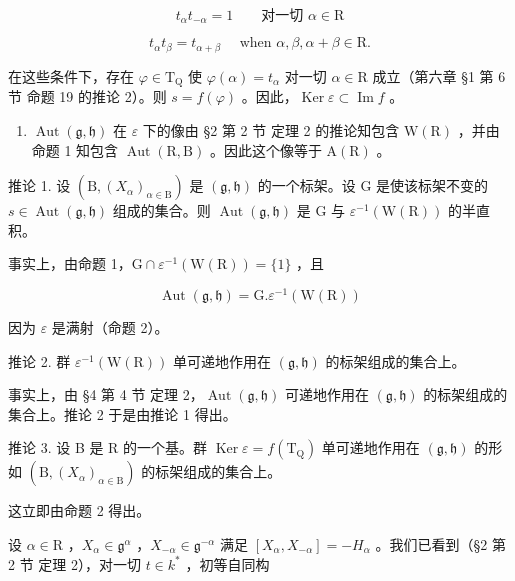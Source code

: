 \[
t _ {\alpha} t _ {- \alpha} = 1 \qquad \text{对一切 } \alpha \in \mathrm{R}
\]

\[
t _ {\alpha} t _ {\beta} = t _ {\alpha + \beta} \quad \text { when } \alpha , \beta , \alpha + \beta \in \mathrm{R}.
\]

在这些条件下，存在 \(\varphi \in \mathrm{T}_{\mathrm{Q}}\) 使 \(\varphi (\alpha) = t_{\alpha}\) 对一切 \(\alpha \in \mathrm{R}\) 成立（第六章 §1 第 6 节 命题 19 的推论 2）。则 \(s = f(\varphi)\) 。因此，\(\operatorname{Ker} \varepsilon \subset \operatorname{Im} f\) 。

\begin{enumerate}
\def\labelenumi{\alph{enumi})}
\setcounter{enumi}{3}
\tightlist
\item
  \(\operatorname{Aut}(\mathfrak{g},\mathfrak{h})\) 在 \(\varepsilon\) 下的像由 §2 第 2 节 定理 2 的推论知包含 \(\mathrm{W}(\mathrm{R})\) ，并由命题 1 知包含 \(\operatorname{Aut}(\mathrm{R},\mathrm{B})\) 。因此这个像等于 \(\mathrm{A}(\mathrm{R})\) 。
\end{enumerate}

推论 1. 设 \((\mathrm{B}, (X_{\alpha})_{\alpha \in \mathrm{B}})\) 是 \((\mathfrak{g}, \mathfrak{h})\) 的一个标架。设 \(\mathrm{G}\) 是使该标架不变的 \(s \in \operatorname{Aut}(\mathfrak{g}, \mathfrak{h})\) 组成的集合。则 \(\operatorname{Aut}(\mathfrak{g}, \mathfrak{h})\) 是 \(\mathrm{G}\) 与 \(\varepsilon^{-1}(\mathrm{W}(\mathrm{R}))\) 的半直积。

事实上，由命题 1，\(\mathrm{G} \cap \varepsilon^{-1}(\mathrm{W}(\mathrm{R})) = \{1\}\) ，且

\[
\operatorname{Aut} (\mathfrak {g}, \mathfrak {h}) = \mathrm{G}. \varepsilon^ {- 1} (\mathrm{W(R)})
\]

因为 \(\varepsilon\) 是满射（命题 2）。

推论 2. 群 \(\varepsilon^{-1}(\mathrm{W}(\mathrm{R}))\) 单可递地作用在 \((\mathfrak{g},\mathfrak{h})\) 的标架组成的集合上。

事实上，由 §4 第 4 节 定理 2，\(\operatorname{Aut}(\mathfrak{g},\mathfrak{h})\) 可递地作用在 \((\mathfrak{g},\mathfrak{h})\) 的标架组成的集合上。推论 2 于是由推论 1 得出。

推论 3. 设 B 是 R 的一个基。群 \(\operatorname{Ker} \varepsilon = f(\mathrm{T}_{\mathrm{Q}})\) 单可递地作用在 \((\mathfrak{g}, \mathfrak{h})\) 的形如 \((\mathrm{B}, (X_{\alpha})_{\alpha \in \mathrm{B}})\) 的标架组成的集合上。

这立即由命题 2 得出。

设 \(\alpha \in \mathrm{R}\) ，\(X_{\alpha} \in \mathfrak{g}^{\alpha}\) ，\(X_{-\alpha} \in \mathfrak{g}^{-\alpha}\) 满足 \([X_{\alpha}, X_{-\alpha}] = -H_{\alpha}\) 。我们已看到（§2 第 2 节 定理 2），对一切 \(t \in k^{*}\) ，初等自同构

